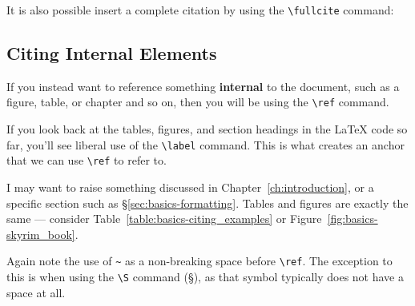 It is also possible insert a complete citation by using the \verb|\fullcite| command:

\medskip

\noindent{}


\subsection*{Citing Internal Elements}%
If you instead want to reference something \textbf{internal} to the document, such as a figure, table, or chapter and so on, then you will be using the \verb|\ref| command.

If you look back at the tables, figures, and section headings in the \LaTeX{} code so far, you'll see liberal use of the \verb|\label| command.
This is what creates an anchor that we can use \verb|\ref| to refer to.

I may want to raise something discussed in Chapter~\ref{ch:introduction}, or a specific section such as \S\ref{sec:basics-formatting}.
Tables and figures are exactly the same --- consider Table~\ref{table:basics-citing_examples} or Figure~\ref{fig:basics-skyrim_book}.

Again note the use of \verb|~| as a non-breaking space before \verb|\ref|.
The exception to this is when using the \verb|\S| command (\S), as that symbol typically does not have a space at all.
